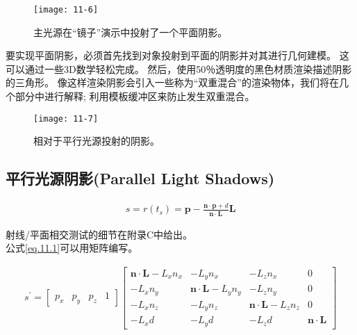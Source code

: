 \begin{figure}[h]
    \texttt{[image: 11-6]}
    \centering
    \caption{主光源在“镜子”演示中投射了一个平面阴影。}
    \label{fig:11-6}
\end{figure}

\begin{flushleft}
要实现平面阴影，必须首先找到对象投射到平面的阴影并对其进行几何建模。 这可以通过一些3D数学轻松完成。 然后，使用50％透明度的黑色材质渲染描述阴影的三角形。 像这样渲染阴影会引入一些称为“双重混合”的渲染物体，我们将在几个部分中进行解释; 利用模板缓冲区来防止发生双重混合。\\
\end{flushleft}

\begin{figure}[h]
    \texttt{[image: 11-7]}
    \centering
    \caption{相对于平行光源投射的阴影。}
    \label{fig:11-7}
\end{figure}

\subsection{平行光源阴影(Parallel Light Shadows)}

\begin{align*}\tag{eq.11.1}\label{eq.11.1}
s=r(t_{s})=\boldsymbol{p}-\frac{\boldsymbol{n}\cdot \boldsymbol{p}+d}{\boldsymbol{n}\cdot \boldsymbol{L}}\boldsymbol{L}
\end{align*}

\begin{flushleft}
射线/平面相交测试的细节在附录C中给出。\\
公式\ref{eq.11.1}可以用矩阵编写。\\
\end{flushleft}

\begin{align*}
s^{'}=\begin{bmatrix}
p_{x} & p_{y} & p_{z} & 1
\end{bmatrix}
\begin{bmatrix}
\boldsymbol{n}\cdot \boldsymbol{L}-L_{x}n_{x} & -L_{y}n_{x} & -L_{z}n_{x} & 0\\
-L_{x}n_{y} & \boldsymbol{n}\cdot \boldsymbol{L}-L_{y}n_{y} & -L_{z}n_{y} & 0\\
-L_{x}n_{z} & -L_{y}n_{z} & \boldsymbol{n}\cdot \boldsymbol{L}-L_{z}n_{z} & 0\\
-L_{x}d & -L_{y}d & -L_{z}d & \boldsymbol{n}\cdot \boldsymbol{L}
\end{bmatrix}
\end{align*}

